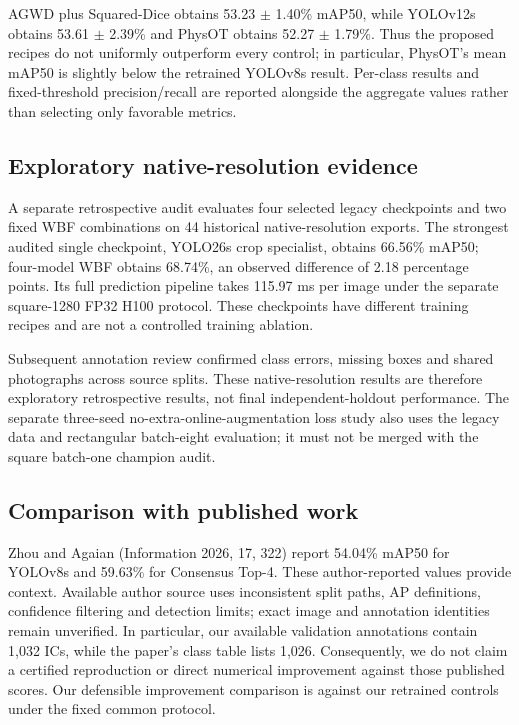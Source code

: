 AGWD plus Squared-Dice obtains 53.23 $\pm$ 1.40\% mAP50, while
YOLOv12s obtains 53.61 $\pm$ 2.39\% and PhysOT obtains 52.27 $\pm$ 1.79\%.
Thus the proposed recipes do not uniformly outperform every control; in
particular, PhysOT's mean mAP50 is slightly below the retrained YOLOv8s result.
Per-class results and fixed-threshold precision/recall are reported alongside
the aggregate values rather than selecting only favorable metrics.

\subsection{Exploratory native-resolution evidence}

A separate retrospective audit evaluates four selected legacy checkpoints
and two fixed WBF combinations on 44 historical native-resolution exports.
The strongest audited single checkpoint, YOLO26s crop specialist, obtains
66.56\% mAP50; four-model WBF obtains 68.74\%,
an observed difference of 2.18 percentage
points. Its full prediction pipeline takes 115.97 ms per image
under the separate square-1280 FP32 H100 protocol. These checkpoints have
different training recipes and are not a controlled training ablation.

Subsequent annotation review confirmed class errors, missing boxes and shared
photographs across source splits. These native-resolution results are therefore
exploratory retrospective results, not final independent-holdout performance.
The separate three-seed no-extra-online-augmentation loss study also uses the
legacy data and rectangular batch-eight evaluation; it must not be merged with
the square batch-one champion audit.

\subsection{Comparison with published work}

Zhou and Agaian (Information 2026, 17, 322) report 54.04\% mAP50 for YOLOv8s
and 59.63\% for Consensus Top-4. These author-reported values provide context.
Available author source uses inconsistent split paths, AP definitions,
confidence filtering and detection limits; exact image and annotation
identities remain unverified. In particular, our available validation
annotations contain 1,032 ICs, while the paper's class table lists 1,026.
Consequently, we do not claim a certified reproduction or direct numerical
improvement against those published scores. Our defensible improvement
comparison is against our retrained controls under the fixed common protocol.

